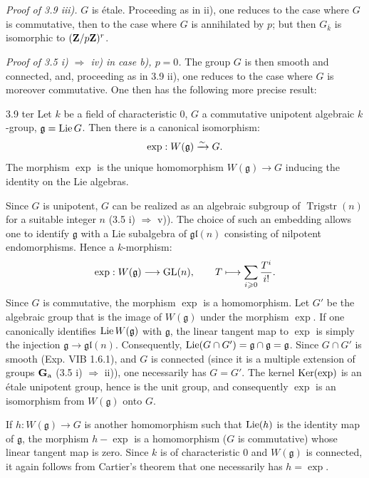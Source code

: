 \noindent\emph{Proof of 3.9 iii).} $G$ is étale. Proceeding as in ii), one reduces to the case where $G$ is commutative, then to the case where $G$ is annihilated by $p$; but then $G_{\overline k}$ is isomorphic to $(\mathbf{Z}/p\mathbf{Z})^r$.

\noindent\emph{Proof of 3.5 i) $\Rightarrow$ iv) in case b), $p=0$.} The group $G$ is then smooth and connected, and, proceeding as in 3.9 ii), one reduces to the case where $G$ is moreover commutative. One then has the following more precise result:
\begin{lemma}{3.9 ter}\label{XVII.3.9ter}
Let $k$ be a field of characteristic 0, $G$ a commutative unipotent algebraic $k$-group, $\mathfrak g=\operatorname{Lie} G$. Then there is a canonical isomorphism:
\[
 \exp:W(\mathfrak g)\xrightarrow{\sim} G.
\]
The morphism $\exp$ is the unique homomorphism $W(\mathfrak g)\to G$ inducing the identity on the Lie algebras.
\end{lemma}
Since $G$ is unipotent, $G$ can be realized as an algebraic subgroup of $\operatorname{Trigstr}(n)$ for a suitable integer $n$ (3.5 i) $\Rightarrow$ v)). The choice of such an embedding allows one to identify $\mathfrak g$ with a Lie subalgebra of $\mathfrak{gl}(n)$ consisting of nilpotent endomorphisms. Hence a $k$-morphism:
\[
 \exp:W(\mathfrak g)\longrightarrow\operatorname{GL}(n),\qquad T\longmapsto\sum_{i\geqslant0}\frac{T^i}{i!}.
\]
Since $G$ is commutative, the morphism $\exp$ is a homomorphism. Let $G'$ be the algebraic group that is the image of $W(\mathfrak g)$ under the morphism $\exp$. If one canonically identifies $\operatorname{Lie} W(\mathfrak g)$ with $\mathfrak g$, the linear tangent map to $\exp$ is simply the injection $\mathfrak g\to\mathfrak{gl}(n)$. Consequently, $\operatorname{Lie}(G\cap G')=\mathfrak g\cap\mathfrak g=\mathfrak g$. Since $G\cap G'$ is smooth (Exp. VIB 1.6.1), and $G$ is connected (since it is a multiple extension of groups $\mathbf{G}_{\mathrm{a}}$ (3.5 i) $\Rightarrow$ ii)), one necessarily has $G=G'$. The kernel $\operatorname{Ker}(\exp)$ is an étale unipotent group, hence is the unit group, and consequently $\exp$ is an isomorphism from $W(\mathfrak g)$ onto $G$.

If $h:W(\mathfrak g)\to G$ is another homomorphism such that $\operatorname{Lie}(h)$ is the identity map of $\mathfrak g$, the morphism $h-\exp$ is a homomorphism ($G$ is commutative) whose linear tangent map is zero. Since $k$ is of characteristic 0 and $W(\mathfrak g)$ is connected, it again follows from Cartier's theorem that one necessarily has $h=\exp$.

